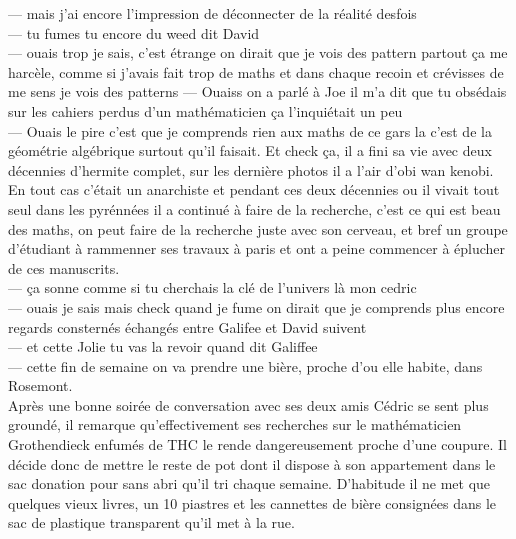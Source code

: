 \documentclass{article}
\begin{document}
--- mais j'ai encore l'impression de déconnecter de la réalité desfois\\
--- tu fumes tu encore du weed dit David\\
--- ouais trop je sais, c'est étrange on dirait que je vois des pattern partout ça me harcèle,
comme si j'avais fait trop de maths et dans chaque recoin et crévisses de me sens je vois des patterns
--- Ouaiss on a parlé  à Joe il m'a dit que tu obsédais sur les cahiers perdus d'un mathématicien
ça l'inquiétait un peu\\
--- Ouais le pire c'est que je comprends rien aux maths de ce gars la c'est de la géométrie algébrique
surtout qu'il faisait. Et check ça, il a fini sa vie avec deux décennies d'hermite complet, sur les
dernière photos il a l'air d'obi wan kenobi. En tout cas c'était un anarchiste et pendant ces
deux décennies ou il vivait tout seul dans les pyrénnées il a continué à faire de la recherche,
c'est ce qui est beau des maths, on peut faire de la recherche juste avec son cerveau, et bref
un groupe d'étudiant à rammenner ses travaux à paris et ont a peine commencer à
éplucher de ces manuscrits.\\
--- ça sonne comme si tu cherchais la clé de l'univers là mon cedric\\
--- ouais je sais mais check quand je fume on dirait que je comprends plus encore\\

regards consternés échangés entre Galifee et David suivent\\

--- et cette Jolie tu vas la revoir quand dit Galiffee\\
--- cette fin de semaine on va prendre une bière, proche d'ou elle habite, dans Rosemont.\\

Après une bonne soirée de conversation avec ses deux amis Cédric se sent plus
groundé, il remarque qu'effectivement ses recherches sur le mathématicien
Grothendieck enfumés de THC le rende dangereusement proche d'une coupure. Il
décide donc de mettre le reste de pot dont il dispose à son appartement dans le
sac donation pour sans abri qu'il tri chaque semaine. D'habitude il ne met que
quelques vieux livres, un 10 piastres et les cannettes de bière consignées dans
le sac de plastique transparent qu'il met à la rue.





\clearpage
\end{document}
